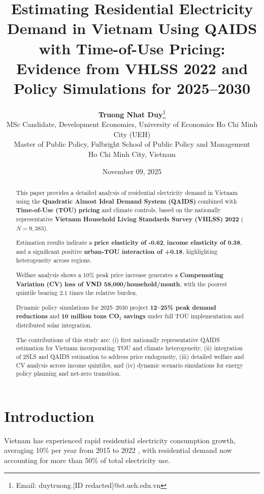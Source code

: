 \documentclass[12pt,a4paper]{article}
\title{\textbf{Estimating Residential Electricity Demand in Vietnam Using QAIDS with Time-of-Use Pricing: Evidence from VHLSS 2022 and Policy Simulations for 2025--2030}}
\author{
	\textbf{Truong Nhat Duy}\thanks{Email: duytruong.[ID redacted]@st.ueh.edu.vn} \\[0.3em]
	\small MSc Candidate, Development Economics, University of Economics Ho Chi Minh City (UEH) \\[-0.2em]
	\small Master of Public Policy, Fulbright School of Public Policy and Management \\[-0.2em]
	\small Ho Chi Minh City, Vietnam
}
\date{November 09, 2025}
\begin{document}
	
	\maketitle
	
	\tableofcontents
	\newpage
	
	\begin{abstract}
		\noindent This paper provides a detailed analysis of residential electricity demand in Vietnam using the \textbf{Quadratic Almost Ideal Demand System (QAIDS)} combined with \textbf{Time-of-Use (TOU) pricing} and climate controls, based on the nationally representative \textbf{Vietnam Household Living Standards Survey (VHLSS) 2022} ($N=9{,}383$).  
		
		Estimation results indicate a \textbf{price elasticity of -0.62}, \textbf{income elasticity of 0.38}, and a significant positive \textbf{urban-TOU interaction of +0.18}, highlighting heterogeneity across regions.  
		
		Welfare analysis shows a 10\% peak price increase generates a \textbf{Compensating Variation (CV) loss of VND 58,000/household/month}, with the poorest quintile bearing 2.1 times the relative burden.  
		
		Dynamic policy simulations for 2025--2030 project \textbf{12--25\% peak demand reductions} and \textbf{10 million tons CO$_2$ savings} under full TOU implementation and distributed solar integration.  
		
		The contributions of this study are: (i) first nationally representative QAIDS estimation for Vietnam incorporating TOU and climate heterogeneity, (ii) integration of 2SLS and QAIDS estimation to address price endogeneity, (iii) detailed welfare and CV analysis across income quintiles, and (iv) dynamic scenario simulations for energy policy planning and net-zero transition.
	\end{abstract}
	
	\section{Introduction}
	Vietnam has experienced rapid residential electricity consumption growth, averaging 10\% per year from 2015 to 2022 \citep{gso2024}, with residential demand now accounting for more than 50\% of total electricity use.  
	
\end{document}
